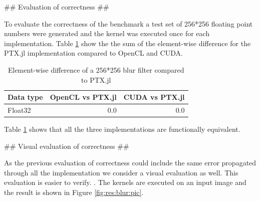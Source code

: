 \begin{markdown}
## Evaluation of correctness ##

To evaluate the correctness of the benchmark a test set of 256*256
floating point numbers were generated and the kernel was executed once
for each implementation. Table \ref{tab:res:blur:diff} show the the
sum of the element-wise difference for the PTX.jl implementation
compared to OpenCL and CUDA.

\begin{table}[H]
  \centering
  \begin{tabular}{|l|r|r|}
    \hline
    Data type & OpenCL vs PTX.jl & CUDA vs PTX.jl \\
    \hline
    Float32  & 0.0 & 0.0 \\
    \hline
  \end{tabular}
  \caption{Element-wise difference of a 256*256 blur filter compared to PTX.jl}
  \label{tab:res:blur:diff}
\end{table}

Table \ref{tab:res:blur:diff} shows that all the three implementations
are functionally equivalent.

## Visual evaluation of correctness ##

As the previous evaluation of correctness could include the same error
propagated through all the implementation we consider a visual
evaluation as well. This evaluation is easier to verify. . The kernels
are executed on an input image and the result is shown in Figure
\ref{fig:res:blur:pic}.


\end{markdown}
